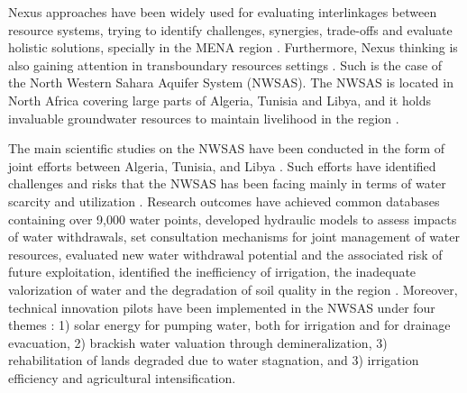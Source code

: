 Nexus approaches have been widely used for evaluating interlinkages between resource systems, trying to identify challenges, synergies, trade-offs and evaluate holistic solutions, specially in the MENA region \cite{hoffNexusApproachMENA2019,kingRapidAssessmentWater2015}. Furthermore, Nexus thinking is also gaining attention in transboundary resources settings \cite{uneceReconcilingResourceUses2015,kingRapidAssessmentWater2015}. Such is the case of the North Western Sahara Aquifer System (NWSAS). The NWSAS is located in North Africa covering large parts of Algeria, Tunisia and Libya, and it holds invaluable groundwater resources to maintain livelihood in the region \cite{BetterValorizationIrrigation2015}.

The main scientific studies on the NWSAS have been conducted in the form of joint efforts between Algeria, Tunisia, and Libya \cite{abuzeidNorthWesternSahara2015}. Such efforts have identified challenges and risks that the NWSAS has been facing mainly in terms of water scarcity and utilization \cite{BetterValorizationIrrigation2015}. Research outcomes have achieved common databases containing over 9,000 water points, developed hydraulic models to assess impacts of water withdrawals, set consultation mechanisms for joint management of water resources, evaluated new water withdrawal potential and the associated risk of future exploitation, identified the inefficiency of irrigation, the inadequate valorization of water and the degradation of soil quality in the region \cite{khaterNorthWesternSahara2014,abuzeidNorthWesternSahara2015,BetterValorizationIrrigation2015,Socioeconomicaspectsirrigation2014}. Moreover, technical innovation pilots have been implemented in the NWSAS under four themes \cite{ossAgriculturalDemostrationPilots2014}: 1) solar energy for pumping water, both for irrigation and for drainage evacuation, 2) brackish water valuation through demineralization, 3) rehabilitation of lands degraded due to water stagnation, and 3) irrigation efficiency and agricultural intensification. 

